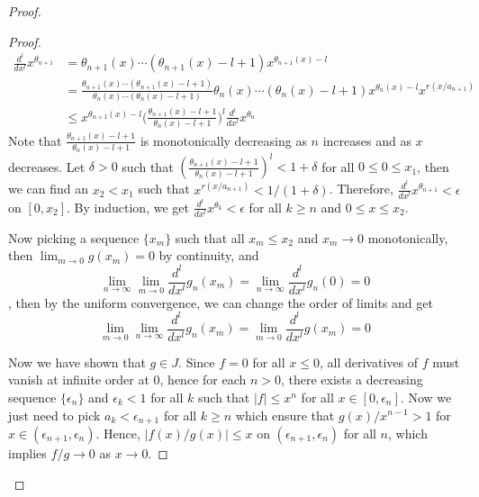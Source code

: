 \documentclass[10pt,a4paper]{amsart}
\begin{document}
\begin{proof}
\begin{proof}
 			\begin{align*}
 				\frac{d^l}{dx^l} x^{\theta_{n+1}}& = \theta_{n+1}(x)\cdots(\theta_{n+1}(x)-l+1) x^{\theta_{n+1}(x) - l}\\
 				& =\frac{\theta_{n+1}(x)\cdots(\theta_{n+1}(x)-l+1)}{\theta_n(x)\cdots(\theta_n(x)-l+1)}\theta_n(x)\cdots(\theta_n(x)-l+1) x^{\theta_n(x) - l}x^{r(x/a_{n+1})} \\
 				& \le x^{\theta_{n+1}(x) - l}  \Bigg(\frac{\theta_{n+1}(x)-l+1}{\theta_{n}(x)-l+1} \Bigg)^l \frac{d^l}{dx^l} x^{\theta_{n}}   
 			\end{align*}
 		    Note that $\frac{\theta_{n+1}(x)-l+1}{\theta_{n}(x)-l+1}$ is monotonically decreasing as $n$ increases and as $x$ decreases. Let $\delta >0$ such that $(\frac{\theta_{n+1}(x)-l+1}{\theta_{n}(x)-l+1})^l < 1+\delta$ for all $0\le 0 \le x_1$, then we can find an $x_2<x_1$ such that $x^{r(x/a_{n+1})} <1/(1+\delta)$. Therefore, $\frac{d^l}{dx^l} x^{\theta_{n+1}} < \epsilon$ on $[0, x_2]$. By induction, we get  $\frac{d^l}{dx^l} x^{\theta_{k}} < \epsilon$ for all $k\ge n$ and $0\le x \le x_2$. 
 		    
 		    Now picking a sequence $\{x_m\}$ such that all $x_m \le x_2$ and $x_m \to 0$ monotonically, then $\lim_{m\to 0} g(x_m) = 0$ by continuity, and 
 		    $$
 		    \lim_{n\to \infty}\lim_{m\to 0}\frac{d^l}{dx^l}g_n(x_m) = \lim_{n\to \infty}\frac{d^l}{dx^l}g_n(0) = 0
 		    $$,
 		    then by the uniform convergence, we can change the order of limits and get
 			$$
 			\lim_{m\to 0}\lim_{n\to \infty}\frac{d^l}{dx^l}g_n(x_m) = \lim_{m\to 0}\frac{d^l}{dx^l}g(x_m) = 0
 			$$
 			
 			Now we have shown that $g\in J$. Since $f=0$ for all $x\le 0$, all derivatives of $f$ must vanish at infinite order at $0$, hence for each $n>0$, there exists a decreasing sequence $\{\epsilon_n\}$ and $\epsilon_k <1$ for all $k$ such that $|f|\le x^{n}$ for all $x\in [0, \epsilon_n]$. Now we just need to pick $a_k < \epsilon_{n+1}$ for all $k\ge n$ which ensure that $g(x)/x^{n-1}>1$ for $x \in (\epsilon_{n+1},\epsilon_n)$. Hence, $|f(x)/g(x)| \le x $  on $(\epsilon_{n+1},\epsilon_n)$ for all $n$, which implies $f/g \to 0$ as $x \to 0$.
 			

\end{proof}
\end{proof}
\end{document}
